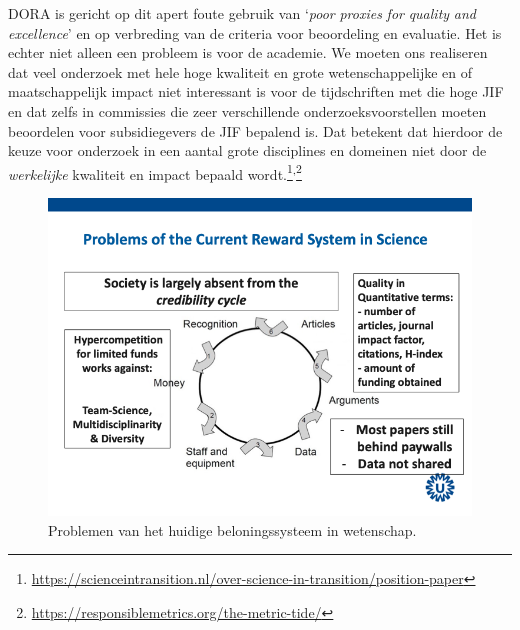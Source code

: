 \documentclass[smallauthor, chapterhaspagenum, nochapterinheader, pagenuminheader,  bigchapnum,medium2, tocpages,  garamond, titleinheader]{jote-book}
\begin{document}
	DORA is gericht op dit apert foute gebruik van ‘\emph{poor}\emph{ }\emph{proxies}\emph{ }\emph{for}\emph{ }\emph{quality}\emph{ }\emph{and}\emph{ excellence}' en op verbreding van de criteria voor beoordeling en evaluatie. Het is echter niet alleen een probleem is voor de academie. We moeten ons realiseren dat veel onderzoek met hele hoge kwaliteit en grote wetenschappelijke en of maatschappelijk impact niet interessant is voor de tijdschriften met die hoge JIF en dat zelfs in commissies die zeer verschillende onderzoeksvoorstellen moeten beoordelen voor subsidiegevers de JIF bepalend is. Dat betekent dat hierdoor de keuze voor onderzoek in een aantal grote disciplines en domeinen niet door de \emph{werkelijke} kwaliteit en impact bepaald wordt.\footnote{\href{https://scienceintransition.nl/over-science-in-transition/position-paper}{https://scienceintransition.nl/over-science-in-transition/position-paper}}\textsuperscript{,}\footnote{\href{https://responsiblemetrics.org/the-metric-tide/}{https://responsiblemetrics.org/the-metric-tide/}}



	\begin{figure}
		\includegraphics[width=\linewidth]{media/image3.png}



		\label{fig:rId17}



		\caption{Problemen van het huidige beloningssysteem in wetenschap.}
	\end{figure}
\end{document}
